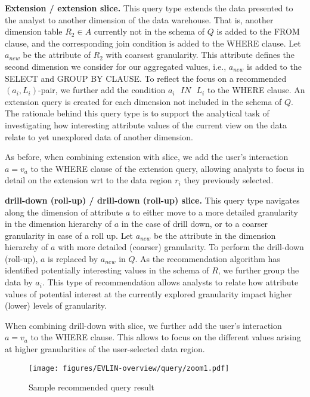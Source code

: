 \smallskip

\noindent \textbf{Extension / extension slice.} This query type extends the data presented to the analyst to another dimension of the data warehouse. That is, another dimension table $R_2 \in A$  currently not in the schema of $Q$ is added to the FROM clause, and the corresponding join condition is added to the WHERE clause. Let $a_{new}$ be the attribute of $R_2$ with coarsest granularity.  This attribute defines the second dimension we consider for our aggregated values, i.e., $a_{new}$ is added to the SELECT and GROUP BY CLAUSE. To reflect the focus on a recommended $(a_i,L_i)$-pair, we further add the condition $a_i\text{ }IN\text{ }L_i$ to the WHERE clause. An extension query is created for each dimension not included in the schema of $Q$.  The rationale behind this query type is to support the analytical task of investigating how interesting attribute values of the current view on the data relate to yet unexplored data of another dimension. 


As before, when combining extension with slice, we add the user's interaction $a = v_a$ to the WHERE clause of the extension query, allowing analysts to focus in detail on the extension wrt to the data region $r_i$ they previously selected.



\smallskip

\noindent \textbf{drill-down (roll-up) / drill-down (roll-up) slice. } This query type navigates along the dimension of attribute $a$ to either move to a more detailed granularity in the dimension hierarchy of $a$ in the case of drill down, or to a coarser granularity in case of a roll up. Let $a_{new}$ be the attribute in the dimension hierarchy of $a$ with more detailed (coarser) granularity. To perform the drill-down (roll-up), $a$ is replaced by $a_{new}$ in $Q$. As the recommendation algorithm has identified potentially interesting values in the schema of $R$, we further group the data by $a_i$. This type of recommendation allows analysts to relate how attribute values of potential interest at the currently explored granularity impact higher (lower) levels of granularity.

When combining drill-down with slice, we further add the user's interaction $a = v_a$ to the WHERE clause. This allows to focus on the different values arising at higher granularities of the user-selected data region. 



\begin{figure}[t]
\centering
 \texttt{[image: figures/EVLIN-overview/query/zoom1.pdf]}
  \caption{Sample recommended query result }
  \label{vis:Zoom}
\end{figure}

